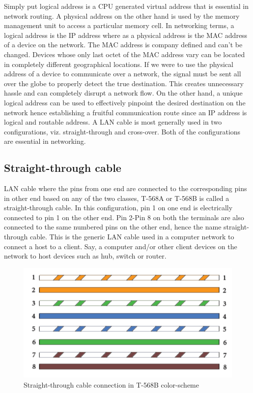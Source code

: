 \documentclass{lab_sheet}
\begin{document}
Simply put logical address is a CPU generated virtual address that is essential in network routing. A physical address on the other hand is used by the memory management unit to access a particular memory cell. In networking terms, a logical address is the IP address where as a physical address is the MAC address of a device on the network. The MAC address is company defined and can't be changed. Devices whose only last octet of the MAC address vary can be located in completely different geographical locations. If we were to use the physical address of a device to communicate over a network, the signal must be sent all over the globe to properly detect the true destination. This creates unnecessary hassle and can completely disrupt a network flow. On the other hand, a unique logical address can be used to effectively pinpoint the desired destination on the network hence establishing a fruitful communication route since an IP address is logical and routable address.
A LAN cable is most generally used in two configurations, viz. straight-through and cross-over. Both of the configurations are essential in networking.
\subsection*{Straight-through cable}
LAN cable where the pins from one end are connected to the corresponding pins in other end based on any of the two classes, T-568A or T-568B is called a straight-through cable. In this configuration, pin 1 on one end is electrically connected to pin 1 on the other end. Pin 2-Pin 8 on both the terminals are also connected to the same numbered pins on the other end, hence the name straight-through cable. This is the generic LAN cable used in a computer network to connect a host to a client. Say, a computer and/or other client devices on the network to host devices such as hub, switch or router.
\begin{figure}[H]
    \centering
    \includegraphics{Figures/straight.png}
    \caption{Straight-through cable connection in T-568B color-scheme}
    \label{fig:straight}
\end{figure}
\end{document}
